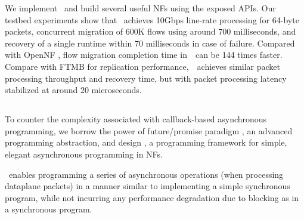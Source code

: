We implement \nfactor~and build several useful NFs using the exposed APIs. Our testbed experiments show that \nfactor~achieves 10Gbps line-rate processing for 64-byte packets, concurrent migration of 600K flows using around 700 milliseconds, and recovery of a single runtime within 70 milliseconds in case of failure. Compared with OpenNF \cite{gember2015opennf}, flow migration completion time in~\nfactor~can be 144 times faster. Compare with FTMB \cite{sherry2015rollback} for replication performance,~\nfactor~achieves similar packet processing throughput and recovery time, but with packet processing latency stabilized at around 20 microseconds. %


\subsection{\netstar}

To counter the complexity associated with callback-based asynchronous programming, we borrow the power of future/promise paradigm \cite{li2007combining, claessen1999poor, wtf}, an advanced programming abstraction, and design \netstar, a programming framework for simple, elegant asynchronous programming in NFs.

\netstar~enables programming a series of asynchronous operations (when processing dataplane packets) in a manner similar to implementing a simple synchronous program, while not incurring any performance degradation due to blocking as in a synchronous program.


